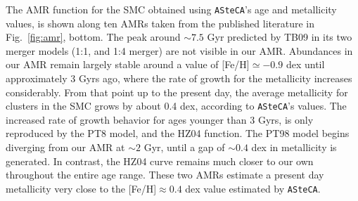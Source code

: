 \documentclass{aa}
\begin{document}
%
The AMR function for the SMC obtained using \texttt{ASteCA}'s age and
metallicity values, is shown along ten AMRs taken from the published literature
in Fig.~\ref{fig:amr}, bottom.
%
%
The peak around ${\sim}7.5$ Gyr predicted by TB09 in its two merger models 
(1:1, and 1:4 merger) are not visible in our AMR.\@
%
Abundances in our AMR remain largely stable around a value of
[Fe/H]${\simeq-}0.9$ dex until approximately 3 Gyrs ago, where the rate of
growth for the metallicity increases considerably. From that point up to the
present day, the average metallicity for clusters in the SMC grows by about 0.4
dex, according to \texttt{ASteCA}'s values.
%
The increased rate of growth behavior for ages younger than 3 Gyrs, is only
reproduced by the PT8 model, and the HZ04 function.
The PT98 model begins diverging from our AMR at ${\sim}2$ Gyr, until a gap of
${\sim}0.4$ dex in metallicity is generated. In contrast, the HZ04 curve remains
much closer to our own throughout the entire age range. These two AMRs estimate
a present day metallicity very close to the [Fe/H]${\approx}0.4$ dex value
estimated by \texttt{ASteCA}.

\end{document}
